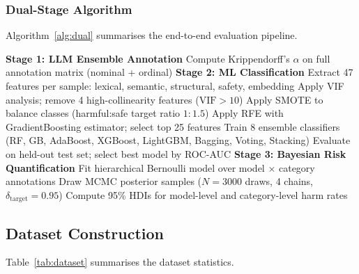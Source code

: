 \documentclass[10pt,letterpaper]{article}
\begin{document}
\subsubsection{Dual-Stage Algorithm}

Algorithm~\ref{alg:dual} summarises the end-to-end evaluation pipeline.

\begin{algorithm}[ht]
\caption{Dual-Stage AI Safety Evaluation Framework}
\label{alg:dual}
\BlankLine
\textbf{Stage 1: LLM Ensemble Annotation}\;
Compute Krippendorff's $\alpha$ on full annotation matrix (nominal + ordinal)\;
\BlankLine
\textbf{Stage 2: ML Classification}\;
Extract 47 features per sample: lexical, semantic, structural, safety, embedding\;
Apply VIF analysis; remove 4 high-collinearity features ($\mathrm{VIF} > 10$)\;
Apply SMOTE to balance classes (harmful:safe target ratio $1:1.5$)\;
Apply RFE with GradientBoosting estimator; select top 25 features\;
Train 8 ensemble classifiers (RF, GB, AdaBoost, XGBoost, LightGBM, Bagging, Voting, Stacking)\;
Evaluate on held-out test set; select best model by ROC-AUC\;
\BlankLine
\textbf{Stage 3: Bayesian Risk Quantification}\;
Fit hierarchical Bernoulli model over model $\times$ category annotations\;
Draw MCMC posterior samples ($N=3000$ draws, 4 chains, $\delta_\mathrm{target}=0.95$)\;
Compute 95\% HDIs for model-level and category-level harm rates\;
\end{algorithm}

\subsection{Dataset Construction}

Table~\ref{tab:dataset} summarises the dataset statistics.
\end{document}

